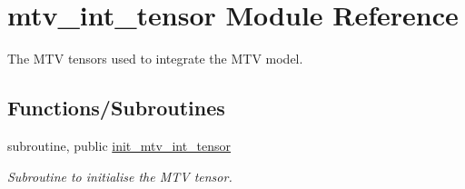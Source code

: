 \hypertarget{namespacemtv__int__tensor}{}\section{mtv\+\_\+int\+\_\+tensor Module Reference}
\label{namespacemtv__int__tensor}


The M\+TV tensors used to integrate the M\+TV model.  


\subsection*{Functions/\+Subroutines}
\begin{DoxyCompactItemize}
\item 
subroutine, public \hyperlink{namespacemtv__int__tensor_a5b3112e973892c80810cbff003525946}{init\+\_\+mtv\+\_\+int\+\_\+tensor}
\begin{DoxyCompactList}\small\item\em Subroutine to initialise the M\+TV tensor. \end{DoxyCompactList}\end{DoxyCompactItemize}
